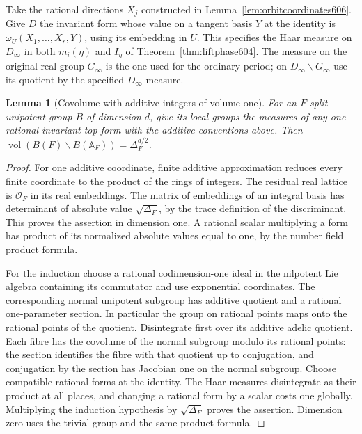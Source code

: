 \documentclass[a4paper,11pt]{article}
\newtheorem{lemma}[proposition]{Lemma}
\theoremstyle{definition}
\theoremstyle{remark}
\numberwithin{equation}{section}
\begin{document}
Take the rational directions \(X_j\) constructed in
Lemma~\ref{lem:orbitcoordinates606}. Give \(D\) the invariant
form whose value on a tangent basis \(Y\) at the identity is
\(\omega_U(X_1,\ldots,X_r,Y)\), using its embedding in \(U\).
This specifies the Haar measure on \(D_\infty\) in both
\(m_i(\eta)\) and \(I_\eta\) of Theorem~\ref{thm:liftphase604}.
The measure on the original real group \(G_\infty\) is the one
used for the ordinary period; on \(D_\infty\backslash G_\infty\)
use its quotient by the specified \(D_\infty\) measure.

\begin{lemma}[Covolume with additive integers of volume one]
\leavevmode\label{lem:unipotentmeasure607}
For an \(F\)-split unipotent group \(B\) of dimension \(d\),
give its local groups the measures of any one rational
invariant top form with the additive conventions above.
Then \(\operatorname{vol}(B(F)\backslash B(\mathbb A_F))
=\Delta_F^{d/2}\).
\end{lemma}
\begin{proof}
For one additive coordinate, finite additive approximation
reduces every finite coordinate to the product of the rings
of integers. The residual real lattice is \(\mathcal O_F\)
in its real embeddings. The matrix of embeddings of an
integral basis has determinant of absolute value
\(\sqrt{\Delta_F}\), by the trace definition of the
discriminant. This proves the assertion in dimension one.
A rational scalar multiplying a form has product of its
normalized absolute values equal to one, by the number field
product formula.

For the induction choose a rational codimension-one ideal in
the nilpotent Lie algebra containing its commutator and use
exponential coordinates. The corresponding normal unipotent
subgroup has additive quotient and a rational one-parameter
section. In particular the group on rational points maps
onto the rational points of the quotient. Disintegrate first
over its additive adelic quotient. Each fibre has the
covolume of the normal subgroup modulo its rational points:
the section identifies the fibre with that quotient up to
conjugation, and conjugation by the section has Jacobian one
on the normal subgroup. Choose compatible rational forms at
the identity. The Haar measures disintegrate as their product
at all places, and changing a rational form by a scalar costs
one globally. Multiplying the induction hypothesis by
\(\sqrt{\Delta_F}\) proves the assertion. Dimension zero
uses the trivial group and the same product formula.
\end{proof}
\end{document}
